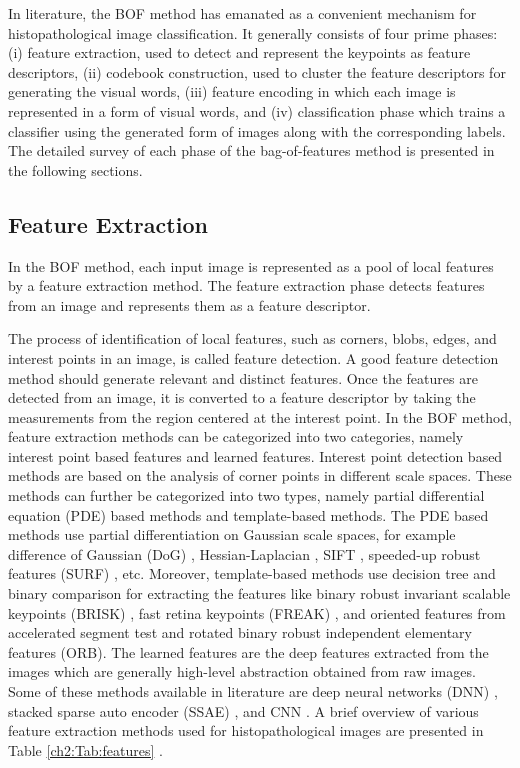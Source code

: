 In literature, the BOF method has emanated as a convenient mechanism for histopathological image classification. It generally consists of four prime phases:  (i) feature extraction,  used to detect and represent the keypoints as feature descriptors, (ii)  codebook construction, used to cluster the feature descriptors for generating the visual words, (iii) feature encoding in which each image is represented in a form of visual words, and (iv) classification phase which trains a classifier using the generated form of images along with the corresponding labels. The detailed survey of each phase of the bag-of-features method is presented in the following sections.

\subsection{Feature Extraction}\label{subsec:Feature Extraction}

In the BOF method, each input image is represented as a pool of local features by a feature extraction method. The feature extraction phase detects features from an image and represents them as a feature descriptor. 

The process of identification of local features, such as corners, blobs, edges, and interest points in an image, is called feature detection. A good feature detection method should generate relevant and distinct features.  Once the features are detected from an image, it is converted to a feature descriptor by taking the measurements from the region centered at the interest point. In the BOF method, feature extraction methods can be categorized into two categories, namely interest point based features and learned features. Interest point detection based methods are based on the analysis of corner points in different scale spaces. These methods can further be categorized into two types, namely partial differential equation (PDE) based methods and template-based methods. The PDE based methods use partial differentiation on Gaussian scale spaces, for example  difference of Gaussian (DoG) \cite{raza2011}, Hessian-Laplacian \cite{orting2018}, SIFT \cite{lowe2004}, speeded-up robust features (SURF) \cite{spanhol2016}, etc. Moreover, template-based methods use decision tree and binary comparison for extracting the features like binary robust invariant scalable keypoints (BRISK) \cite{leutenegger2011}, fast retina keypoints (FREAK) \cite{alahi2012}, and oriented features from accelerated segment test and rotated binary robust independent elementary features (ORB)\cite{spanhol2016}. The learned features are the deep features extracted from the images which are generally high-level abstraction obtained from raw images. Some of these methods available in literature are deep neural networks (DNN) \cite{bar2015}, stacked sparse auto encoder (SSAE) \cite{xu2014}, and CNN \cite{cruz2013}. A brief overview of various feature extraction methods used for histopathological images are presented in Table \ref{ch2:Tab:features} \cite{li2015}.


